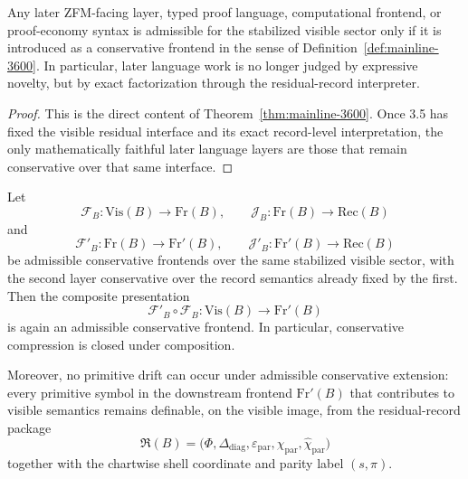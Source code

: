 \begin{corollary}
\label{cor:mainline-3600}
Any later ZFM-facing layer, typed proof language, computational frontend, or proof-economy syntax is admissible for the stabilized visible sector only if it is introduced as a conservative frontend in the sense of Definition~\ref{def:mainline-3600}. In particular, later language work is no longer judged by expressive novelty, but by exact factorization through the residual-record interpreter.
\end{corollary}

\begin{proof}
This is the direct content of Theorem~\ref{thm:mainline-3600}. Once 3.5 has fixed the visible residual interface and its exact record-level interpretation, the only mathematically faithful later language layers are those that remain conservative over that same interface.
\end{proof}

\begin{lemma}
\label{lem:mainline-3610}
Let
\[
  \mathcal F_B:\mathrm{Vis}(B)\to \mathrm{Fr}(B), \qquad
  \mathcal J_B:\mathrm{Fr}(B)\to \mathrm{Rec}(B)
\]
and
\[
  \mathcal F'_B:\mathrm{Fr}(B)\to \mathrm{Fr}'(B), \qquad
  \mathcal J'_B:\mathrm{Fr}'(B)\to \mathrm{Rec}(B)
\]
be admissible conservative frontends over the same stabilized visible sector, with the second layer conservative over the record semantics already fixed by the first. Then the composite presentation
\[
  \mathcal F'_B\circ \mathcal F_B:\mathrm{Vis}(B)\to \mathrm{Fr}'(B)
\]
is again an admissible conservative frontend. In particular, conservative compression is closed under composition.

Moreover, no primitive drift can occur under admissible conservative extension: every primitive symbol in the downstream frontend \(\mathrm{Fr}'(B)\) that contributes to visible semantics remains definable, on the visible image, from the residual-record package
\[
  \mathfrak R(B)=\bigl(\Phi,\Delta_{\mathrm{diag}},\varepsilon_{\mathrm{par}},\chi_{\mathrm{par}},\widehat\chi_{\mathrm{par}}\bigr)
\]
together with the chartwise shell coordinate and parity label \((s,\pi)\).
\end{lemma}

